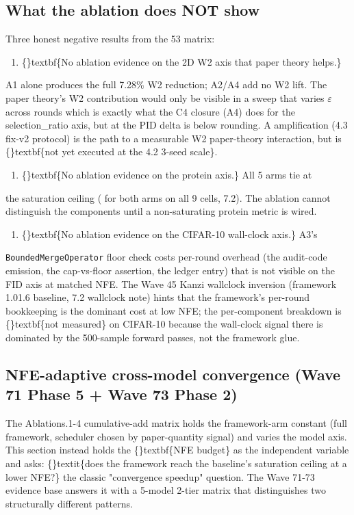 \documentclass{article}
\begin{document}
\subsection{What the ablation does NOT show}
Three honest negative results from the 53 matrix:

\begin{enumerate}
\item \{\}textbf\{No ablation evidence on the 2D W2 axis that paper theory helps.\}
\end{enumerate}
A1 alone produces the full 7.28\% W2 reduction; A2/A4 add no W2 lift. The paper theory's W2 contribution would only be visible in a sweep that varies $\varepsilon$ across rounds  which is exactly what the C4 closure (A4) does for the selection\_ratio axis, but at  the PID delta is below rounding. A  amplification (4.3 fix-v2 protocol) is the path to a measurable W2  paper-theory interaction, but is \{\}textbf\{not yet executed at the 4.2 3-seed scale\}.

\begin{enumerate}
\item \{\}textbf\{No ablation evidence on the protein axis.\} All 5 arms tie at
\end{enumerate}
the saturation ceiling ( for both arms on all 9 cells, 7.2). The ablation cannot distinguish the components until a non-saturating protein metric is wired.

\begin{enumerate}
\item \{\}textbf\{No ablation evidence on the CIFAR-10 wall-clock axis.\} A3's
\end{enumerate}
\texttt{BoundedMergeOperator} floor check costs per-round overhead (the audit-code emission, the cap-vs-floor assertion, the ledger entry) that is not visible on the FID axis at matched NFE. The Wave 45 Kanzi wallclock inversion (framework 1.01.6 baseline, 7.2 wallclock note) hints that the framework's per-round bookkeeping is the dominant cost at low NFE; the per-component breakdown is \{\}textbf\{not measured\} on CIFAR-10 because the wall-clock signal there is dominated by the 500-sample forward passes, not the framework glue.

\subsection{NFE-adaptive cross-model convergence (Wave 71 Phase 5 + Wave 73 Phase 2)}
The Ablations.1-4 cumulative-add matrix holds the framework-arm constant (full framework, scheduler chosen by paper-quantity signal) and varies the model axis. This section instead holds the \{\}textbf\{NFE budget\} as the independent variable and asks: \{\}textit\{does the framework reach the baseline's saturation ceiling at a lower NFE?\}  the classic "convergence speedup" question. The Wave 71-73 evidence base answers it with a 5-model  2-tier matrix that distinguishes two structurally different patterns.
\end{document}
